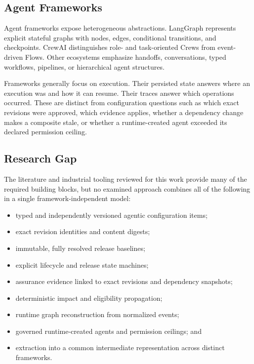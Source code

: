 \documentclass[10pt]{article}
\begin{document}
\subsection{Agent Frameworks}

Agent frameworks expose heterogeneous abstractions. LangGraph represents explicit stateful graphs with nodes, edges, conditional transitions, and checkpoints. CrewAI distinguishes role- and task-oriented Crews from event-driven Flows. Other ecosystems emphasize handoffs, conversations, typed workflows, pipelines, or hierarchical agent structures.

Frameworks generally focus on execution. Their persisted state answers where an execution was and how it can resume. Their traces answer which operations occurred. These are distinct from configuration questions such as which exact revisions were approved, which evidence applies, whether a dependency change makes a composite stale, or whether a runtime-created agent exceeded its declared permission ceiling.

\subsection{Research Gap}

The literature and industrial tooling reviewed for this work provide many of the required building blocks, but no examined approach combines all of the following in a single framework-independent model:

\begin{itemize}[leftmargin=*]
  \item typed and independently versioned agentic configuration items;
  \item exact revision identities and content digests;
  \item immutable, fully resolved release baselines;
  \item explicit lifecycle and release state machines;
  \item assurance evidence linked to exact revisions and dependency snapshots;
  \item deterministic impact and eligibility propagation;
  \item runtime graph reconstruction from normalized events;
  \item governed runtime-created agents and permission ceilings; and
  \item extraction into a common intermediate representation across distinct frameworks.
\end{itemize}
\end{document}
